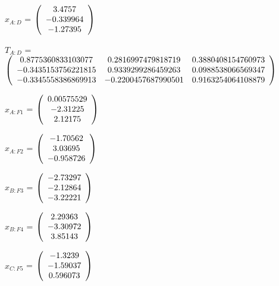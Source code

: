 \begin{description}
$x_{A:D}$ = $\left( \begin{array} {ccc}     3.4757 \\  -0.339964 \\   -1.27395 
\end{array} \right)\\ \\$

$T_{A:D}$ = $\left( \begin{array} {ccc} 
   0.8775360833103077 & 0.2816997479818719 & 0.3880408154760973 \\ 
   -0.3435153756221815 & 0.9339299286459263 & 0.0988538066569347 \\ 
   -0.3345558386869913 & -0.2200457687990501 & 0.9163254064108879 \\
\end{array} \right)\\ \\$

$x_{A:F1}$ = $\left( \begin{array} {ccc} 0.00575529 \\   -2.31225 \\    2.12175 
\end{array} \right)\\ \\$

$x_{A:F2}$ = $\left( \begin{array} {ccc}   -1.70562 \\    3.03695 \\  -0.958726 
\end{array} \right)\\ \\$

$x_{B:F3}$ = $\left( \begin{array} {ccc}   -2.73297 \\   -2.12864 \\   -3.22221 
\end{array} \right)\\ \\$

$x_{B:F4}$ = $\left( \begin{array} {ccc}    2.29363 \\   -3.30972 \\    3.85143 
\end{array} \right)\\ \\$

$x_{C:F5}$ = $\left( \begin{array} {ccc}    -1.3239 \\   -1.59037 \\   0.596073 
\end{array} \right)\\ \\$


\end{description}
